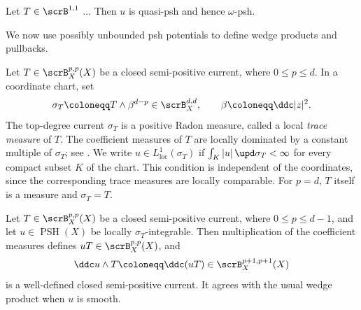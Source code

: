 \begin{proposition}[label=\labelNFM{prop:potential-in-lelong-equation-is-quasi-psh-for-positive}, status=draft, tag=0000000]
	Let $T \in \scrB^{1,1}$ ... 
	Then $u$ is quasi-psh and hence $\omega$-psh.
	\Yang{}
\end{proposition}

We now use possibly unbounded psh potentials to define wedge products and pullbacks.

\begin{construction}[label=\labelNFM{constr:products-and-pullbacks-of-currents}, status=draft, tag=0000000]
	Let $T \in \scrB_X^{p,p}(X)$ be a closed semi-positive current, where $0 \leq p \leq d$.
	In a coordinate chart, set
	\[ \sigma_T \coloneqq T \wedge \beta^{d-p} \in \scrB_X^{d,d}, \qquad \beta \coloneqq \ddc|z|^2. \]
	The top-degree current $\sigma_T$ is a positive Radon measure, called a local \emph{trace measure} of $T$.
	The coefficient measures of $T$ are locally dominated by a constant multiple of $\sigma_T$;
	see \cite[Chapter~III, \S 1.B, Proposition~1.14]{Demailly-2012-ComplexAnalyticDifferential}.
	We write $u \in L^1_{\mathrm{loc}}(\sigma_T)$ if $\int_K |u|\,\upd\sigma_T < \infty$ for every compact subset $K$ of the chart.
	This condition is independent of the coordinates, since the corresponding trace measures are locally comparable.
	For $p = d$, $T$ itself is a measure and $\sigma_T = T$.
\end{construction}

\begin{proposition}[label=\labelNFM{prop:wedge-of-psh-function-and-semi-positve-currents}, status=draft, tag=0000000, title={{{\cite[Theorem 6.3.1]{Dinh-Sibony-2005-IntroductionTheoryCurrents}}}}]
	Let $T \in \scrB_X^{p,p}(X)$ be a closed semi-positive current, where $0 \leq p \leq d-1$,
	and let $u \in \operatorname{PSH}(X)$ be locally $\sigma_T$-integrable.
	Then multiplication of the coefficient measures defines $uT \in \scrB_X^{p,p}(X)$, and
	\[ \ddc u \wedge T \coloneqq \ddc(uT) \in \scrB_X^{p+1,p+1}(X) \]
	is a well-defined closed semi-positive current.
	It agrees with the usual wedge product when $u$ is smooth.
\end{proposition}

